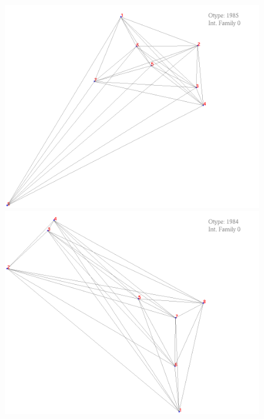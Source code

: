 \documentclass[11pt,epsf,times,letterpaper]{article}
\begin{document}
	\begin{figure}
		\includegraphics[scale=.4]{if_tam0_tam1/25.png}
		\includegraphics[scale=.4]{if_tam0_tam1/26.png}
	\end{figure}
	
\end{document}
